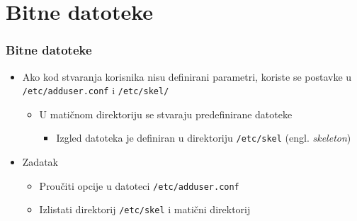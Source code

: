 \documentclass{beamer}
\newcommand{\shell}[1]{\texttt{#1}}
\begin{document}
\section{Bitne datoteke}
\begin{frame}[t]
\frametitle{Bitne datoteke}
\begin{itemize}
  \item Ako kod stvaranja korisnika nisu definirani parametri, koriste se 
        postavke u \shell{/etc/adduser.conf} i \shell{/etc/skel/}
  \begin{itemize}
    \item U matičnom direktoriju se stvaraju predefinirane datoteke
    \begin{itemize}
      \item Izgled datoteka je definiran u direktoriju \shell{/etc/skel}
               (engl. \emph{skeleton})
    \end{itemize}
  \end{itemize}
  \item Zadatak
  \begin{itemize}
    \item Proučiti opcije u datoteci \shell{/etc/adduser.conf}
    \item Izlistati direktorij \shell{/etc/skel} i matični direktorij
  \end{itemize}
\end{itemize}
\end{frame}
\end{document}
